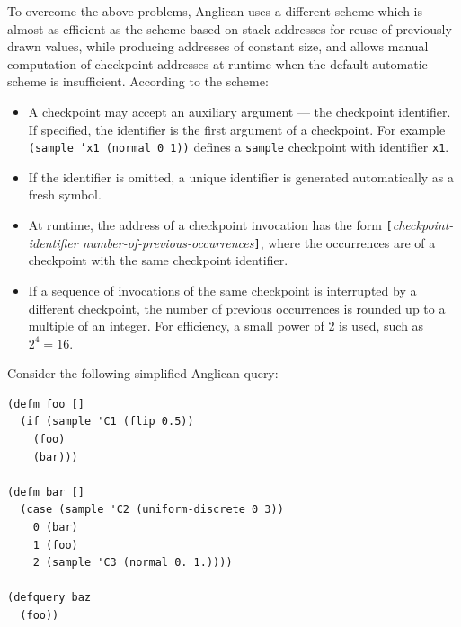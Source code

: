 \documentclass[preprint]{sigplanconf}
\begin{document}
To overcome the above problems, Anglican uses a different scheme
which is almost as efficient as the scheme based on stack addresses for
reuse of previously drawn values, while producing addresses of constant size,
and allows manual computation of checkpoint addresses at runtime
when the default automatic scheme is insufficient. According to
the scheme:
\begin{itemize}
    \item A checkpoint may accept an auxiliary argument --- the
        checkpoint identifier. If specified, the identifier is the first
        argument of a checkpoint. For example \texttt{(sample
        'x1  (normal 0 1))} defines a \texttt{sample} checkpoint
        with identifier \texttt{x1}.
    \item If the identifier is omitted, a unique identifier is
        generated automatically as a fresh symbol.
    \item At runtime, the address of a checkpoint invocation has
        the form
        \texttt{[}\textit{checkpoint-identifier
        number-of-previous-occurrences}\texttt{]}, where the
        occurrences are of a checkpoint with the same checkpoint
        identifier.
    \item If a sequence of invocations of the same checkpoint is
        interrupted by a different checkpoint, the number of
        previous occurrences is rounded up to a multiple of
        an integer. For efficiency, a small power of 2 is used,
        such as $2^4 = 16$.
\end{itemize}

Consider the following simplified Anglican query:

\begin{lstlisting}[style=default]
(defm foo []
  (if (sample 'C1 (flip 0.5))
    (foo)
    (bar)))

(defm bar []
  (case (sample 'C2 (uniform-discrete 0 3))
    0 (bar)
    1 (foo)
    2 (sample 'C3 (normal 0. 1.))))

(defquery baz
  (foo))
\end{lstlisting}
\end{document}
